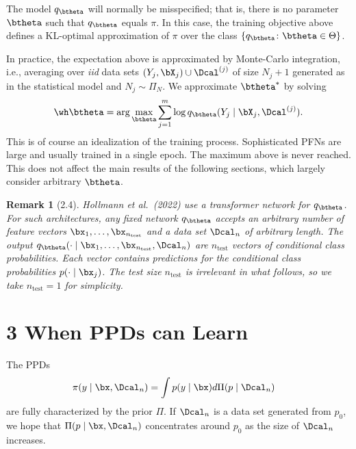 \documentclass[aspectratio=169,10pt]{beamer}
\newtheorem{remark}[theorem]{Remark}
\newcommand{\currentheading}{\ifx\insertsubsection\empty\insertsection\else\insertsubsection\fi}
\newcommand{\test}{{\text{test}}}
\begin{document}
\begin{frame}{\currentheading}
The model $q_{\btheta}$ will normally be misspecified; that is, there is no parameter $\btheta$ such that $q_{\btheta}$ equals $\pi$. In this case, the training objective above defines a KL-optimal approximation of $\pi$ over the class $\{q_{\btheta}\colon \btheta \in \Theta\}$.
\end{frame}

\begin{frame}{\currentheading}
In practice, the expectation above is approximated by Monte-Carlo integration, i.e., averaging over \emph{iid} data sets $(Y_j, \bX_j) \cup \Dcal^{(j)}$ of size $N_j + 1$ generated as in the statistical model and $N_j \sim \Pi_N$. We approximate $\btheta^*$ by solving
\begin{align*}
	\wh \btheta = \arg\max_{\btheta} \sum_{j = 1}^m \log q_{\btheta}(Y_j \mid \bX_j, \Dcal^{(j)}).
\end{align*}
This is of course an idealization of the training process. Sophisticated PFNs are large and usually trained in a single epoch. The maximum above is never reached. This does not affect the main results of the following sections, which largely consider arbitrary $\btheta$.
\end{frame}

\begin{frame}{\currentheading}
\begin{remark}[2.4]
Hollmann et al.\ (2022) use a transformer network for $q_{\btheta}$. For such architectures, any fixed network $q_{\btheta}$ accepts an arbitrary number of feature vectors $\bx_1, \dots, \bx_{n_\test}$ and a data set $\Dcal_{n}$ of arbitrary length. The output $q_{\btheta}( \cdot \mid \bx_1, \dots, \bx_{n_\test}, \Dcal_{n})$ are $n_{\test}$ vectors of conditional class probabilities. Each vector contains predictions for the conditional class probabilities $p(\cdot \mid \bx_j)$. The test size $n_{\test}$ is irrelevant in what follows, so we take $n_{\test} = 1$ for simplicity.
\end{remark}
\end{frame}

\section{3 When PPDs can Learn}

\begin{frame}{\currentheading}
The PPDs
\begin{align*}
	\pi(y\mid \bx, \Dcal_n)
	 & =  \int p(y\mid \bx) d\Pi(p \mid \Dcal_n)
\end{align*}
are fully characterized by the prior $\Pi$. If $\Dcal_n$ is a data set generated from $p_0$, we hope that $\Pi(p \mid \bx, \Dcal_n)$ concentrates around $p_0$ as the size of $\Dcal_n$ increases.
\end{frame}
\end{document}
